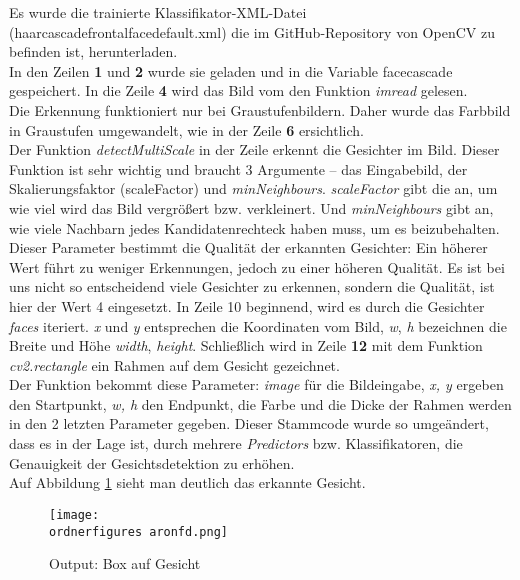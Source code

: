 \justify 
Es wurde die trainierte Klassifikator-XML-Datei (haarcascade\textunderscore frontalface\textunderscore default.xml) die im GitHub-Repository von OpenCV zu befinden ist, herunterladen.\\
In den Zeilen \textbf{1} und \textbf{2} wurde sie geladen und in die Variable face\textunderscore cascade gespeichert.
In die Zeile \textbf{4} wird das Bild vom den Funktion \emph{imread} gelesen.\\
Die Erkennung funktioniert nur bei Graustufenbildern. Daher wurde das Farbbild in Graustufen umgewandelt, wie in der Zeile \textbf{6} ersichtlich.\\
Der Funktion \textit{ detectMultiScale } in der Zeile  erkennt die Gesichter im Bild. Dieser Funktion ist sehr wichtig und braucht 3 Argumente – das Eingabebild, der Skalierungsfaktor (scaleFactor) und \textit{minNeighbours}. 
\justify
\textit{scaleFactor} gibt die an, um wie viel wird das Bild vergrößert bzw. verkleinert. 
Und \textit{minNeighbours} gibt an, wie viele Nachbarn jedes Kandidatenrechteck haben muss, um es beizubehalten. Dieser Parameter bestimmt die Qualität der erkannten Gesichter: Ein höherer Wert führt zu weniger Erkennungen, jedoch zu einer höheren Qualität.
Es ist bei uns nicht so entscheidend viele Gesichter zu erkennen, sondern die Qualität, ist hier der Wert 4 eingesetzt.
\justify
In Zeile 10 beginnend, wird es durch die Gesichter \textit{faces} iteriert. 
\textit{x} und \textit{y} entsprechen die Koordinaten vom Bild, \textit{w}, \textit{h} bezeichnen die Breite und Höhe \textit{width}, \textit{height}.
\justify
Schließlich wird in Zeile \textbf{12} mit dem Funktion \textit{cv2.rectangle} ein Rahmen auf dem Gesicht gezeichnet. \\
Der Funktion bekommt diese Parameter: \textit{image} für die Bildeingabe, \textit{x, y} ergeben den Startpunkt, \textit{w, h} den Endpunkt, die Farbe und die Dicke der Rahmen werden in den 2 letzten Parameter gegeben.
\justify
Dieser Stammcode wurde so umgeändert, dass es in der Lage ist, durch mehrere \textit{Predictors} bzw. Klassifikatoren, die Genauigkeit der Gesichtsdetektion zu erhöhen. \\
\justify
Auf Abbildung \ref{fig:aron} sieht man deutlich das erkannte Gesicht. 

\begin{figure}[H]
	\centering
	\texttt{[image: \\ordnerfigures aronfd.png]}
	\caption{Output: Box auf Gesicht}
	\label{fig:aron}
\end{figure}


